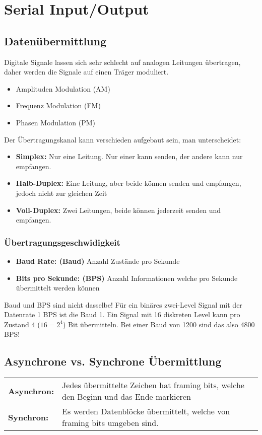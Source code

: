 \section{Serial Input/Output}
\subsection{Datenübermittlung}
Digitale Signale lassen sich sehr schlecht auf analogen Leitungen übertragen, daher werden die Signale auf einen Träger moduliert.
\begin{itemize}
  \item Amplituden Modulation (AM)
  \item Frequenz Modulation (FM)
  \item Phasen Modulation (PM)
\end{itemize}

Der Übertragungskanal kann verschieden aufgebaut sein, man unterscheidet:
\begin{itemize}
  \item \textbf{Simplex:} Nur eine Leitung. Nur einer kann senden, der andere kann nur empfangen.
  \item \textbf{Halb-Duplex:} Eine Leitung, aber beide können senden und empfangen, jedoch nicht zur gleichen Zeit
  \item \textbf{Voll-Duplex:} Zwei Leitungen, beide können jederzeit senden und empfangen.
\end{itemize}

\subsubsection{Übertragungsgeschwidigkeit}
\begin{itemize}
  \item \textbf{Baud Rate: (Baud)} Anzahl Zustände pro Sekunde
  \item \textbf{Bits pro Sekunde: (BPS)} Anzahl Informationen welche pro Sekunde übermittelt werden können
\end{itemize}
Baud und BPS sind nicht dasselbe! Für ein binäres zwei-Level Signal mit der Datenrate 1 BPS ist die Baud 1.
Ein Signal mit 16 diskreten Level kann pro Zustand 4 ($16=2^4$) Bit übermitteln. Bei einer Baud von 1200 sind das also 4800 BPS! 

\subsection{Asynchrone vs. Synchrone Übermittlung}
\begin{tabular}{ll}
	\textbf{Asynchron:}	& Jedes übermittelte Zeichen hat framing bits, welche den Beginn und das Ende markieren \\
	\textbf{Synchron:}	& Es werden Datenblöcke übermittelt, welche von framing	bits umgeben sind.
\end{tabular}
